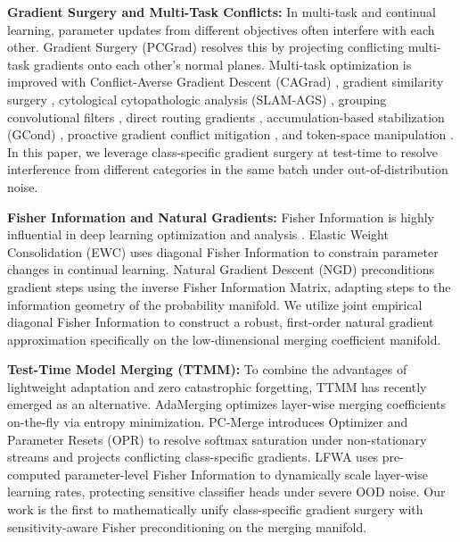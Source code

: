 \documentclass{article}
\theoremstyle{plain}
\theoremstyle{definition}
\theoremstyle{remark}
\begin{document}
\textbf{Gradient Surgery and Multi-Task Conflicts:} In multi-task and continual learning, parameter updates from different objectives often interfere with each other. Gradient Surgery (PCGrad) \cite{yu_gradient_2020} resolves this by projecting conflicting multi-task gradients onto each other's normal planes. Multi-task optimization is improved with Conflict-Averse Gradient Descent (CAGrad) \cite{liu_conflictaverse_2021}, gradient similarity surgery \cite{borsani_gradient_2025}, cytological cytopathologic analysis (SLAM-AGS) \cite{acerbis_slamags_2025}, grouping convolutional filters \cite{pan_gradient_2025}, direct routing gradients \cite{liu_direct_2025}, accumulation-based stabilization (GCond) \cite{limarenko_gcond_2025}, proactive gradient conflict mitigation \cite{zhang_proactive_2024}, and token-space manipulation \cite{jeong_resolving_2025}. In this paper, we leverage class-specific gradient surgery at test-time to resolve interference from different categories in the same batch under out-of-distribution noise.

\textbf{Fisher Information and Natural Gradients:} Fisher Information is highly influential in deep learning optimization and analysis \cite{gomes_towards_2025, deng_uncertainty_2023, soen_variance_2021}. Elastic Weight Consolidation (EWC) \cite{loke_overcoming_2025, ahadzi_continuous_2025, thompson_overcoming_2019, wang_clfm_2022} uses diagonal Fisher Information to constrain parameter changes in continual learning. Natural Gradient Descent (NGD) \cite{zhang_fast_2019, jnini_dual_2025, xu_convergence_2024, liu_reconstructing_2024, abdulkadirov_approach_2023} preconditions gradient steps using the inverse Fisher Information Matrix, adapting steps to the information geometry of the probability manifold. We utilize joint empirical diagonal Fisher Information to construct a robust, first-order natural gradient approximation specifically on the low-dimensional merging coefficient manifold.

\textbf{Test-Time Model Merging (TTMM):} To combine the advantages of lightweight adaptation and zero catastrophic forgetting, TTMM has recently emerged as an alternative. AdaMerging \cite{adamerging} optimizes layer-wise merging coefficients on-the-fly via entropy minimization. PC-Merge \cite{pc_merge} introduces Optimizer and Parameter Resets (OPR) to resolve softmax saturation under non-stationary streams and projects conflicting class-specific gradients. LFWA \cite{lfwa_merge} uses pre-computed parameter-level Fisher Information to dynamically scale layer-wise learning rates, protecting sensitive classifier heads under severe OOD noise. Our work is the first to mathematically unify class-specific gradient surgery with sensitivity-aware Fisher preconditioning on the merging manifold.
\end{document}
